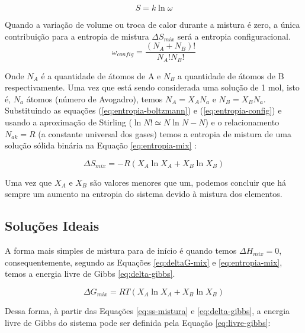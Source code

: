 \begin{equation} 
 S =  k\ln \omega
\label{eq:entropia-boltzmann}
\end{equation}

Quando a variação de volume ou troca de calor durante a mistura é zero, a única contribuição para a entropia de mistura $\Delta S_{mix}$ será a entropia configuracional. 
\begin{equation} 
\omega_{config}=\frac{(N_{A} + N_{B})!}{N_{A}!N_{B}!}
\label{eq:entropia-config}
\end{equation}

Onde $N_{A}$ é a quantidade de átomos de A e $N_{B}$ a quantidade de átomos de B respectivamente. Uma vez que está sendo considerada uma solução de 1 mol, isto é, $N_{a}$ átomos (número de Avogadro), temos 
$N_{A}= X_{A}N_{a}$ e $N_{B}= X_{B}N_{a}$. Substituindo as equações (\ref{eq:entropia-boltzmann}) e (\ref{eq:entropia-config}) e usando a aproximação de Stirling ($\ln N! \simeq N \ln N - N$) e o relacionamento $N_{ak} = R$ (a constante universal dos gases) temos a entropia de mistura de uma solução sólida binária na Equação \ref{eq:entropia-mix} :

\begin{equation} 
\Delta S_{mix} = -R(X_{A}\ln X_{A} + X_{B}\ln X_{B})
\label{eq:entropia-mix}
\end{equation}


Uma vez que  $X_{A}$ e $X_{B}$ são valores menores que um, podemos concluir que há sempre um aumento na entropia do sistema devido à mistura dos elementos.

\subsection{Soluções Ideais}\label{sec:LABEL_CHP_2_SEC_A_SUB_B}

 A forma mais simples de mistura para de início é quando temos $\Delta H_{mix}=0$, consequentemente, segundo as Equações \ref{eq:deltaG-mix} e \ref{eq:entropia-mix}, temos a energia livre de Gibbs   \ref{eq:delta-gibbs}.

\begin{equation} 
\Delta G_{mix} = RT(X_{A}\ln X_{A} + X_{B}\ln X_{B})
\label{eq:delta-gibbs}
\end{equation}

Dessa forma, à partir das Equações \ref{eq:ss-mistura} e \ref{eq:delta-gibbs}, a energia livre de Gibbs do sistema pode ser definida pela Equação \ref{eq:livre-gibbs}:

